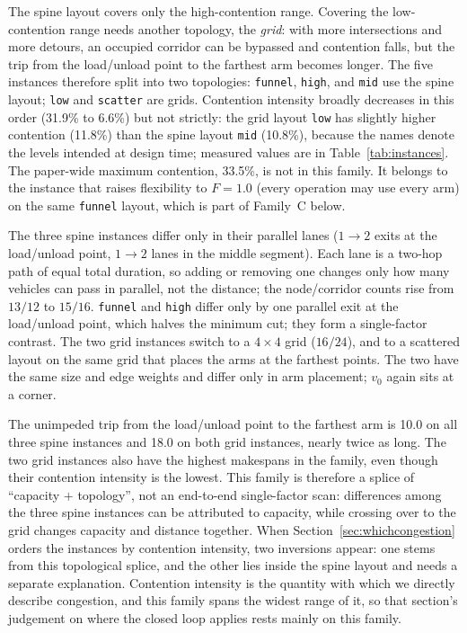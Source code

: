 \documentclass[manuscript,screen,review]{acmart}
\newcommand{\ContentionLo}{6.6\%}
\newcommand{\ContentionHi}{33.5\%}
\newcommand{\ContentionAHi}{31.9\%}
\newcommand{\ContentionALow}{11.8\%}
\newcommand{\ContentionAMid}{10.8\%}
\newcommand{\LegDumbbell}{10.0}          %
\newcommand{\LegGrid}{18.0}              %
\begin{document}
The spine layout covers only the high-contention range. Covering the low-contention range needs another topology, the \emph{grid}: with more intersections and more detours, an occupied corridor can be bypassed and contention falls, but the trip from the load/unload point to the farthest arm becomes longer.
The five instances therefore split into two topologies: \texttt{funnel}, \texttt{high}, and \texttt{mid} use the spine layout; \texttt{low} and \texttt{scatter} are grids.
Contention intensity broadly decreases in this order (\ContentionAHi{} to \ContentionLo{}) but not strictly: the grid layout \texttt{low} has slightly higher contention (\ContentionALow{}) than the spine layout \texttt{mid} (\ContentionAMid{}), because the names denote the levels intended at design time; measured values are in Table~\ref{tab:instances}.
The paper-wide maximum contention, \ContentionHi{}, is not in this family. It belongs to the instance that raises flexibility to $F=1.0$ (every operation may use every arm) on the same \texttt{funnel} layout, which is part of Family~C below.

The three spine instances differ only in their parallel lanes ($1\to2$ exits at the load/unload point, $1\to2$ lanes in the middle segment). Each lane is a two-hop path of equal total duration, so adding or removing one changes only how many vehicles can pass in parallel, not the distance; the node/corridor counts rise from $13/12$ to $15/16$.
\texttt{funnel} and \texttt{high} differ only by one parallel exit at the load/unload point, which halves the minimum cut; they form a single-factor contrast.
The two grid instances switch to a $4\times4$ grid ($16/24$), and to a scattered layout on the same grid that places the arms at the farthest points. The two have the same size and edge weights and differ only in arm placement; $v_0$ again sits at a corner.

The unimpeded trip from the load/unload point to the farthest arm is \LegDumbbell{} on all three spine instances and \LegGrid{} on both grid instances, nearly twice as long.
The two grid instances also have the highest makespans in the family, even though their contention intensity is the lowest.
This family is therefore a splice of ``capacity $+$ topology'', not an end-to-end single-factor scan: differences among the three spine instances can be attributed to capacity, while crossing over to the grid changes capacity and distance together.
When Section~\ref{sec:whichcongestion} orders the instances by contention intensity, two inversions appear: one stems from this topological splice, and the other lies inside the spine layout and needs a separate explanation.
Contention intensity is the quantity with which we directly describe congestion, and this family spans the widest range of it, so that section's judgement on where the closed loop applies rests mainly on this family.
\end{document}
